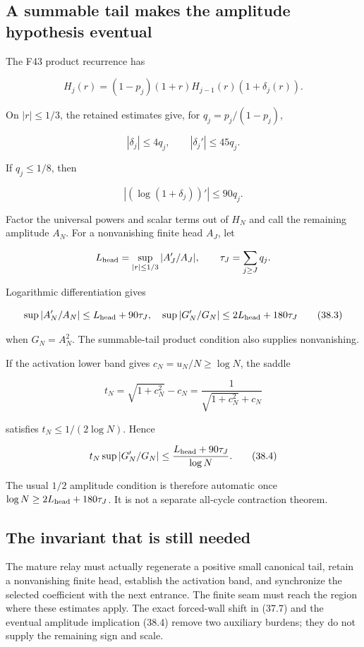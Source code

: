 \documentclass[
  10pt,
  a4paper,
  10pt,
  oneside,
  openany]{book}
\begin{document}
\subsection{A summable tail makes the amplitude hypothesis
eventual}\label{a-summable-tail-makes-the-amplitude-hypothesis-eventual}

The F43 product recurrence has

\[
 H_j(r)=(1-p_j)(1+r)H_{j-1}(r)(1+\delta_j(r)).
\]

On \(|r|\le1/3\), the retained estimates give, for \(q_j=p_j/(1-p_j)\),

\[
 |\delta_j|\le4q_j,\qquad|\delta_j'|\le45q_j.
\]

If \(q_j\le1/8\), then

\[
 |(\log(1+\delta_j))'|\le90q_j.
\]

Factor the universal powers and scalar terms out of \(H_N\) and call the
remaining amplitude \(A_N\). For a nonvanishing finite head \(A_J\), let

\[
 L_{\rm head}=\sup_{|r|\le1/3}|A_J'/A_J|,
 \qquad\tau_J=\sum_{j\ge J}q_j.
\]

Logarithmic differentiation gives

\[
 \sup|A_N'/A_N|\le L_{\rm head}+90\tau_J,
 \quad\sup|G_N'/G_N|\le2L_{\rm head}+180\tau_J
 \tag{38.3}\label{eq:38.3}
\]

when \(G_N=A_N^2\). The summable-tail product condition also supplies
nonvanishing.

If the activation lower band gives \(c_N=u_N/N\ge\log N\), the saddle

\[
 t_N=\sqrt{1+c_N^2}-c_N
 =\frac1{\sqrt{1+c_N^2}+c_N}
\]

satisfies \(t_N\le1/(2\log N)\). Hence

\[
 t_N\sup|G_N'/G_N|
 \le\frac{L_{\rm head}+90\tau_J}{\log N}.
 \tag{38.4}\label{eq:38.4}
\]

The usual \(1/2\) amplitude condition is therefore automatic once
\(\log N\ge2L_{\rm head}+180\tau_J\). It is not a separate all-cycle
contraction theorem.

\subsection{The invariant that is still
needed}\label{the-invariant-that-is-still-needed}

The mature relay must actually regenerate a positive small canonical
tail, retain a nonvanishing finite head, establish the activation band,
and synchronize the selected coefficient with the next entrance. The
finite seam must reach the region where these estimates apply. The exact
forced-wall shift in (37.7) and the eventual amplitude implication
(38.4) remove two auxiliary burdens; they do not supply the remaining
sign and scale.
\end{document}
